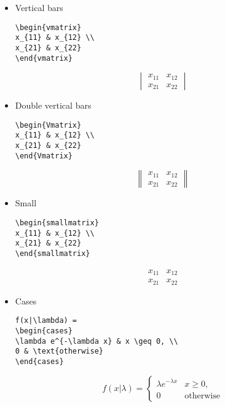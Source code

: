 \documentclass[text,xhtml,itex]{internet}
\begin{document}
\begin{itemize}
\item Vertical bars

\begin{verbatim}
\begin{vmatrix}
x_{11} & x_{12} \\
x_{21} & x_{22}
\end{vmatrix}
\end{verbatim}

\[
\begin{vmatrix}
x_{11} & x_{12} \\
x_{21} & x_{22}
\end{vmatrix}
\]

\item Double vertical bars

\begin{verbatim}
\begin{Vmatrix}
x_{11} & x_{12} \\
x_{21} & x_{22}
\end{Vmatrix}
\end{verbatim}

\[
\begin{Vmatrix}
x_{11} & x_{12} \\
x_{21} & x_{22}
\end{Vmatrix}
\]

\item Small

\begin{verbatim}
\begin{smallmatrix}
x_{11} & x_{12} \\
x_{21} & x_{22}
\end{smallmatrix}
\end{verbatim}

\[
\begin{smallmatrix}
x_{11} & x_{12} \\
x_{21} & x_{22}
\end{smallmatrix}
\]

\item Cases

\begin{verbatim}
f(x|\lambda) =
\begin{cases}
\lambda e^{-\lambda x} & x \geq 0, \\
0 & \text{otherwise}
\end{cases}
\end{verbatim}

\[
f(x|\lambda) =
\begin{cases}
\lambda e^{-\lambda x} & x \geq 0, \\
0 & \text{otherwise}
\end{cases}
\]


\end{itemize}
\end{document}
